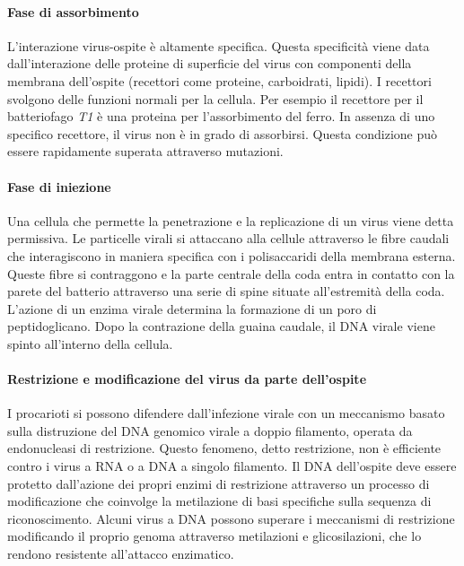 			\paragraph{Fase di assorbimento}
			L'interazione virus-ospite è altamente specifica. 
			Questa specificità viene data dall'interazione delle proteine di superficie del virus con componenti della membrana dell'ospite (recettori come proteine, carboidrati, lipidi). 
			I recettori svolgono delle funzioni normali per la cellula. 
			Per esempio il recettore per il batteriofago \emph{T1} è una proteina per l'assorbimento del ferro. 
			In assenza di uno specifico recettore, il virus non è in grado di assorbirsi.
			Questa condizione pu\`o essere rapidamente superata attraverso mutazioni.

			\paragraph{Fase di iniezione}
			Una cellula che permette la penetrazione e la replicazione di un virus viene detta permissiva. 
			Le particelle virali si attaccano alla cellule attraverso le fibre caudali che interagiscono in maniera specifica con i polisaccaridi della membrana esterna. 
			Queste fibre si contraggono e la parte centrale della coda entra in contatto con la parete del batterio attraverso una serie di spine situate all'estremità della coda. 
			L'azione di un enzima virale determina la formazione di un poro di peptidoglicano. 
			Dopo la contrazione della guaina caudale, il DNA virale viene spinto all'interno della cellula.

			\paragraph{Restrizione e modificazione del virus da parte dell'ospite}
			I procarioti si possono difendere dall'infezione virale con un meccanismo basato sulla distruzione del DNA genomico virale a doppio filamento, operata da endonucleasi di restrizione. 
			Questo fenomeno, detto restrizione, non è efficiente contro i virus a RNA o a DNA a singolo filamento. 
			Il DNA dell'ospite deve essere protetto dall'azione dei propri enzimi di restrizione attraverso un processo di modificazione che coinvolge la metilazione di basi specifiche sulla sequenza di riconoscimento. 
			Alcuni virus a DNA possono superare i meccanismi di restrizione modificando il proprio genoma attraverso metilazioni e glicosilazioni, che lo rendono resistente all'attacco enzimatico.

